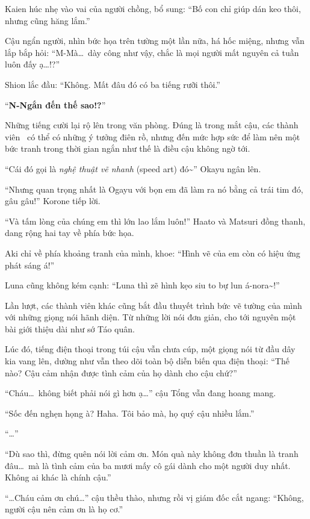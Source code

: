 \documentclass[../main.tex]{subfiles}
\begin{document}
Kaien húc nhẹ vào vai của người chồng, bổ sung: ``Bố con chỉ giúp dán keo thôi, nhưng cũng hăng lắm.''

Cậu ngẩn người, nhìn bức họa trên tường một lần nữa, há hốc miệng, nhưng vẫn lắp bắp hỏi: ``M-Mà\dots\ dày công như vậy, chắc là mọi người mất nguyên cả tuần luôn đấy ạ\dots!?''

Shion lắc đầu: ``Không. Mất đâu đó có ba tiếng rưỡi thôi.''

``\textbf{N-Ngắn đến thế sao!?}''

Những tiếng cười lại rộ lên trong văn phòng. Đúng là trong mắt cậu, các thành viên \hll\ có thể có những ý tưởng điên rồ, nhưng đến mức hợp sức để làm nên một bức tranh trong thời gian ngắn như thế là điều cậu không ngờ tới.

``Cái đó gọi là \emph{nghệ thuật vẽ nhanh} (speed art) đó\~{}'' Okayu ngân lên.

``Nhưng quan trọng nhất là Ogayu với bọn em đã làm ra nó bằng cả trái tim đó, gâu gâu!'' Korone tiếp lời.

``Và tấm lòng của chúng em thì lớn lao lắm luôn!'' Haato và Matsuri đồng thanh, dang rộng hai tay về phía bức họa.

Aki chỉ về phía khoảng tranh của mình, khoe: ``Hình vẽ của em còn có hiệu ứng phát sáng á!''

Luna cũng không kém cạnh: ``Luna thì zẽ hình kẹo siu to bự lun á-nora\~{}!''

Lần lượt, các thành viên khác cũng bắt đầu thuyết trình bức vẽ tường của mình với những giọng nói hãnh diện. Từ những lời nói đơn giản, cho tới nguyên một bài giới thiệu dài như sớ Táo quân.

Lúc đó, tiếng điện thoại trong túi cậu vẫn chưa cúp, một giọng nói từ đầu dây kia vang lên, dường như vẫn theo dõi toàn bộ diễn biến qua điện thoại: ``Thế nào? Cậu cảm nhận được tình cảm của họ dành cho cậu chứ?''

``Cháu\dots\ không biết phải nói gì hơn ạ\dots'' cậu Tổng vẫn đang hoang mang.

``Sốc đến nghẹn họng à? Haha. Tôi bảo mà, họ quý cậu nhiều lắm.''

``\dots''

``Dù sao thì, đừng quên nói lời cảm ơn. Món quà này không đơn thuần là tranh đâu\dots\ mà là tình cảm của ba mươi mấy cô gái dành cho một người duy nhất. Không ai khác là chính cậu.''

``\dots Cháu cảm ơn chú\dots'' cậu thều thào, nhưng rồi vị giám đốc cắt ngang: ``Không, người cậu nên cảm ơn là họ cơ.''
\end{document}
